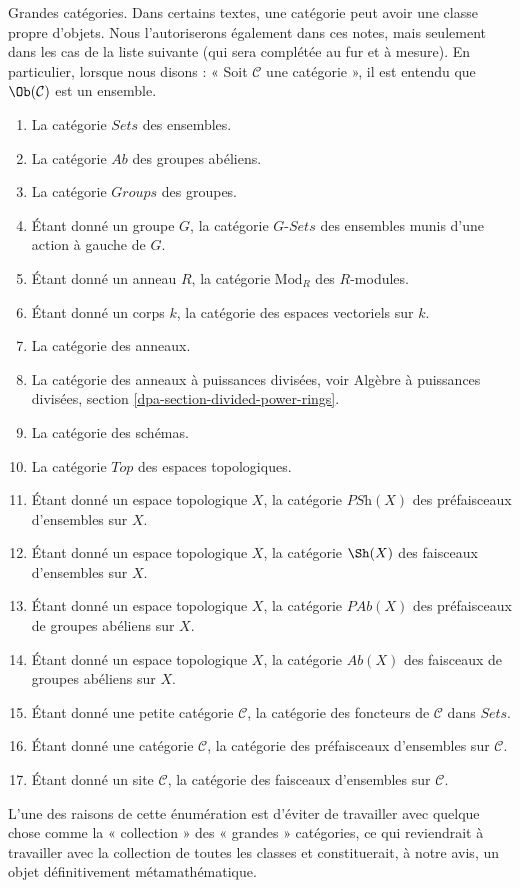 \begin{remark}
\label{remark-big-categories}
Grandes catégories. Dans certains textes, une catégorie peut avoir une classe
propre d'objets. Nous l'autoriserons également dans ces notes, mais seulement
dans les cas de la liste suivante (qui sera complétée au fur et à mesure).
En particulier, lorsque nous disons : « Soit $\mathcal{C}$ une catégorie »,
il est entendu que $\Ob(\mathcal{C})$ est un ensemble.
\begin{enumerate}
\item La catégorie $\textit{Sets}$ des ensembles.
\item La catégorie $\textit{Ab}$ des groupes abéliens.
\item La catégorie $\textit{Groups}$ des groupes.
\item Étant donné un groupe $G$, la catégorie $G\textit{-Sets}$ des
ensembles munis d'une action à gauche de $G$.
\item Étant donné un anneau $R$, la catégorie $\text{Mod}_R$ des $R$-modules.
\item Étant donné un corps $k$, la catégorie des espaces vectoriels sur $k$.
\item La catégorie des anneaux.
\item La catégorie des anneaux à puissances divisées, voir
Algèbre à puissances divisées, section \ref{dpa-section-divided-power-rings}.
\item La catégorie des schémas.
\item La catégorie $\textit{Top}$ des espaces topologiques.
\item Étant donné un espace topologique $X$, la catégorie
$\textit{PSh}(X)$ des préfaisceaux d'ensembles sur $X$.
\item Étant donné un espace topologique $X$, la catégorie
$\Sh(X)$ des faisceaux d'ensembles sur $X$.
\item Étant donné un espace topologique $X$, la catégorie
$\textit{PAb}(X)$ des préfaisceaux de groupes abéliens sur $X$.
\item Étant donné un espace topologique $X$, la catégorie
$\textit{Ab}(X)$ des faisceaux de groupes abéliens sur $X$.
\item Étant donné une petite catégorie $\mathcal{C}$, la catégorie des foncteurs
de $\mathcal{C}$ dans $\textit{Sets}$.
\item Étant donné une catégorie $\mathcal{C}$, la catégorie des préfaisceaux
d'ensembles sur $\mathcal{C}$.
\item Étant donné un site $\mathcal{C}$, la catégorie des faisceaux
d'ensembles sur $\mathcal{C}$.
\end{enumerate}
L'une des raisons de cette énumération est d'éviter de travailler
avec quelque chose comme la « collection » des « grandes » catégories,
ce qui reviendrait à travailler avec la collection de toutes les classes
et constituerait, à notre avis, un objet définitivement métamathématique.
\end{remark}

